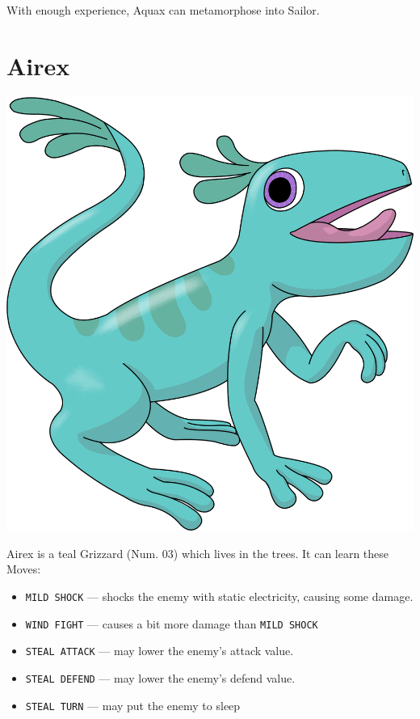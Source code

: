 \documentclass[10pt,twocolumn,openany,article]{memoir}
\begin{document}
With enough experience, Aquax can metamorphose into Sailor.

\ifdefined\DEMO\else

\section{Airex}

\includegraphics[width=\columnwidth]{../Manual/Airex.png}

Airex is  a teal  Grizzard (Num. 03)  which lives in  the trees.  It can
learn these Moves:

\begin{itemize}
\item \texttt{MILD SHOCK} --- shocks  the enemy with static electricity,
  causing some damage.
\item \texttt{WIND FIGHT} --- causes a bit more damage than \texttt{MILD SHOCK}
\item \texttt{STEAL ATTACK} --- may lower the enemy's attack value.
\item \texttt{STEAL DEFEND} --- may lower the enemy's defend value.
\item \texttt{STEAL TURN} --- may put the enemy to sleep
\end{itemize}
\end{document}
